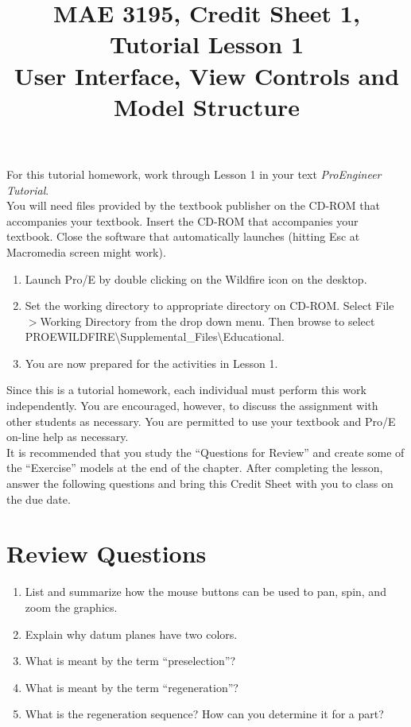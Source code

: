 \documentclass[12pt]{article}
\title{MAE 3195, Credit Sheet 1, Tutorial Lesson 1\\
User Interface, View Controls and Model Structure}
\date{}
\begin{document}
\maketitle

For this tutorial homework, work through Lesson 1 in your text \textit{ProEngineer Tutorial}.\\  

You will need files provided by the textbook publisher on the CD-ROM that accompanies your textbook. Insert the CD-ROM that accompanies your textbook. Close the software that automatically launches (hitting Esc at Macromedia screen might work).
\begin{enumerate}
	\item Launch Pro/E by double clicking on the Wildfire icon on the desktop.
	\item Set the working directory to appropriate directory on CD-ROM. Select File$>$Working Directory from the drop down menu. Then browse to select\\
PROEWILDFIRE\textbackslash Supplemental\_Files\textbackslash Educational.
	\item You are now prepared for the activities in Lesson 1.\\
\end{enumerate}	

Since this is a tutorial homework, each individual must perform this work independently. You are encouraged, however, to discuss the assignment with other students as necessary. You are permitted to use your textbook and Pro/E on-line help as necessary.\\

It is recommended that you study the ``Questions for Review'' and create some of the ``Exercise'' models at the end of the chapter. After completing the lesson, answer the following questions and bring this Credit Sheet with you to class on the due date.

\pagebreak

\section*{Review Questions}
\begin{enumerate}
	\item List and summarize how the mouse buttons can be used to pan, spin, and zoom the graphics.
	\vspace{1.25in}
	\item Explain why datum planes have two colors.
	\vspace{1.25in}
	\item What is meant by the term ``preselection''?
	\vspace{1.25in}
	\item What is meant by the term ``regeneration''?
	\vspace{1.25in}
	\item What is the regeneration sequence? How can you determine it for a part?
\end{enumerate}
\end{document}
